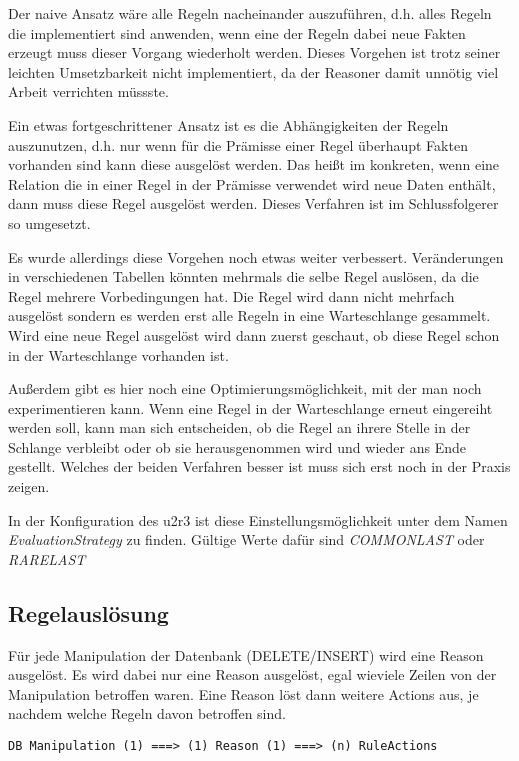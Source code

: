 Der naive Ansatz wäre alle Regeln nacheinander auszuführen, d.h. alles Regeln die implementiert sind anwenden, wenn eine der Regeln dabei neue Fakten erzeugt muss dieser Vorgang wiederholt werden. Dieses Vorgehen ist trotz seiner leichten Umsetzbarkeit nicht implementiert, da der Reasoner damit unnötig viel Arbeit verrichten müssste.

Ein etwas fortgeschrittener Ansatz ist es die Abhängigkeiten der Regeln auszunutzen, d.h. nur wenn für die Prämisse einer Regel überhaupt Fakten vorhanden sind kann diese ausgelöst werden. Das heißt im konkreten, wenn eine Relation die in einer Regel in der Prämisse verwendet wird neue Daten enthält, dann muss diese Regel ausgelöst werden. Dieses Verfahren ist im Schlussfolgerer so umgesetzt.

Es wurde allerdings diese Vorgehen noch etwas weiter verbessert. Veränderungen in verschiedenen Tabellen könnten mehrmals die selbe Regel auslösen, da die Regel mehrere Vorbedingungen  hat. Die Regel wird dann nicht mehrfach ausgelöst sondern es werden erst alle Regeln in eine Warteschlange gesammelt. Wird eine neue Regel ausgelöst wird dann zuerst geschaut, ob diese Regel schon in der Warteschlange vorhanden ist.

Außerdem gibt es hier noch eine Optimierungsmöglichkeit, mit der man noch experimentieren kann. Wenn eine Regel in der Warteschlange erneut eingereiht werden soll, kann man sich entscheiden, ob die Regel an ihrere Stelle in der Schlange verbleibt oder ob sie herausgenommen wird und wieder ans Ende gestellt. Welches der beiden Verfahren besser ist muss sich erst noch in der Praxis zeigen.

In der Konfiguration des u2r3 ist diese Einstellungsmöglichkeit unter dem Namen \emph{EvaluationStrategy} zu finden. Gültige Werte dafür sind \emph{COMMONLAST} oder \emph{RARELAST}

\subsection{Regelauslösung}
Für jede Manipulation der Datenbank (DELETE/INSERT) wird eine Reason ausgelöst. Es wird dabei nur eine Reason ausgelöst, egal wieviele Zeilen von der Manipulation betroffen waren. Eine Reason löst dann weitere Actions aus, je nachdem welche Regeln davon betroffen sind.

\begin{verbatim}
DB Manipulation (1) ===> (1) Reason (1) ===> (n) RuleActions
\end{verbatim}


